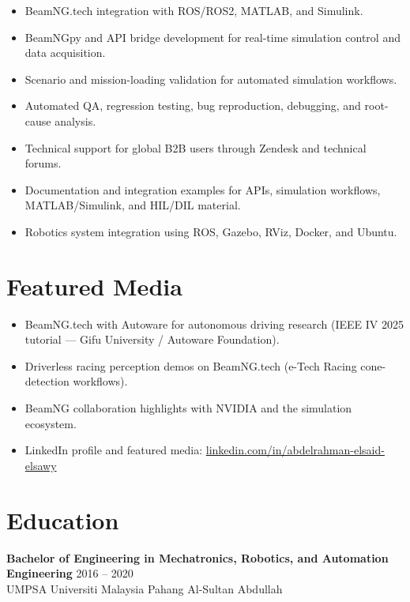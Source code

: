 \documentclass[11pt,a4paper]{article}
\begin{document}
\begin{itemize}
    \item BeamNG.tech integration with ROS/ROS2, MATLAB, and Simulink.
    \item BeamNGpy and API bridge development for real-time simulation control and data acquisition.
    \item Scenario and mission-loading validation for automated simulation workflows.
    \item Automated QA, regression testing, bug reproduction, debugging, and root-cause analysis.
    \item Technical support for global B2B users through Zendesk and technical forums.
    \item Documentation and integration examples for APIs, simulation workflows, MATLAB/Simulink, and HIL/DIL material.
    \item Robotics system integration using ROS, Gazebo, RViz, Docker, and Ubuntu.
\end{itemize}

\section*{Featured Media}

\begin{itemize}
    \item BeamNG.tech with Autoware for autonomous driving research (IEEE IV 2025 tutorial — Gifu University / Autoware Foundation).
    \item Driverless racing perception demos on BeamNG.tech (e-Tech Racing cone-detection workflows).
    \item BeamNG collaboration highlights with NVIDIA and the simulation ecosystem.
    \item LinkedIn profile and featured media: \href{https://www.linkedin.com/in/abdelrahman-elsaid-elsawy}{linkedin.com/in/abdelrahman-elsaid-elsawy}
\end{itemize}

\section*{Education}

\textbf{\color{PrimaryColor}Bachelor of Engineering in Mechatronics, Robotics, and Automation Engineering}
\hfill 2016 -- 2020\\
UMPSA Universiti Malaysia Pahang Al-Sultan Abdullah

\end{document}
